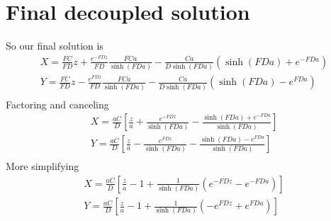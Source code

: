 \documentclass[11pt]{article}
\begin{document}
\section{Final decoupled solution}
So our final solution is
\begin{equation}\begin{aligned}
	X = \frac{FC}{FD} z + \frac{e^{-FD z}}{FD} \frac{FCa}{\sinh(FD a)} - \frac{Ca}{D\sinh(FD a)} (\sinh(FD a) + e^{-FD a}) \\
	Y = \frac{FC}{FD} z - \frac{e^{ FD z}}{FD} \frac{FCa}{\sinh(FD a)} - \frac{Ca}{D\sinh(FD a)} (\sinh(FD a) - e^{ FD a}) \\
\end{aligned} \end{equation}
Factoring and canceling
\begin{equation}\begin{aligned}
	X = \frac{aC}{D} \left[ \frac{z}{a} + \frac{e^{-FD z}}{\sinh(FD a)} - \frac{\sinh(FD a) + e^{-FD a}}{\sinh(FD a)} \right] \\
	Y = \frac{aC}{D} \left[ \frac{z}{a} - \frac{e^{ FD z}}{\sinh(FD a)} - \frac{\sinh(FD a) - e^{ FD a}}{\sinh(FD a)} \right] \\
\end{aligned} \end{equation}
More simplifying
\begin{equation}\begin{aligned}
	X = \frac{aC}{D} \left[ \frac{z}{a} - 1 + \frac{1}{\sinh(FD a)} \left(   e^{-FD z} - e^{-FD a} \right) \right] \\
	Y = \frac{aC}{D} \left[ \frac{z}{a} - 1 + \frac{1}{\sinh(FD a)} \left( - e^{ FD z} + e^{ FD a} \right) \right] \\
\end{aligned} \end{equation}
\end{document}
